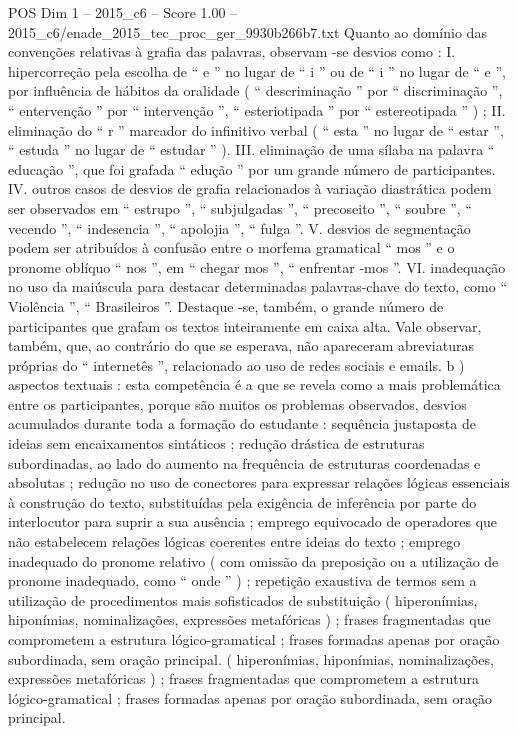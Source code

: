 \begin{textsample}{POS Dim 1 – 2015\_c6 – Score 1.00 – 2015\_c6/enade\_2015\_tec\_proc\_ger\_9930b266b7.txt}
Quanto ao domínio das convenções relativas à grafia das palavras, observam -se desvios como : I. hipercorreção pela escolha de “ e ” no lugar de “ i ” ou de “ i ” no lugar de “ e ”, por influência de hábitos da oralidade ( “ descriminação ” por “ discriminação ”, “ entervenção ” por “ intervenção ”, “ esteriotipada ” por “ estereotipada ” ) ; II. eliminação do “ r ” marcador do infinitivo verbal ( “ esta ” no lugar de “ estar ”, “ estuda ” no lugar de “ estudar ” ).
III. eliminação de uma sílaba na palavra “ educação ”, que foi grafada “ edução ” por um grande número de participantes.
IV. outros casos de desvios de grafia relacionados à variação diastrática podem ser observados em “ estrupo ”, “ subjulgadas ”, “ precoseito ”, “ soubre ”, “ vecendo ”, “ indesencia ”, “ apolojia ”, “ fulga ”.
V. desvios de segmentação podem ser atribuídos à confusão entre o morfema gramatical “ mos ” e o pronome oblíquo “ nos ”, em “ chegar mos ”, “ enfrentar -mos ”.
VI. inadequação no uso da maiúscula para destacar determinadas palavras-chave do texto, como “ Violência ”, “ Brasileiros ”.
Destaque -se, também, o grande número de participantes que grafam os textos inteiramente em caixa alta.
Vale observar, também, que, ao contrário do que se esperava, não apareceram abreviaturas próprias do “ internetês ”, relacionado ao uso de redes sociais e emails. b ) aspectos textuais : esta competência é a que se revela como a mais problemática entre os participantes, porque são muitos os problemas observados, desvios acumulados durante toda a formação do estudante : sequência justaposta de ideias sem encaixamentos sintáticos ; redução drástica de estruturas subordinadas, ao lado do aumento na frequência de estruturas coordenadas e absolutas ; redução no uso de conectores para expressar relações lógicas essenciais à construção do texto, substituídas pela exigência de inferência por parte do interlocutor para suprir a sua ausência ; emprego equivocado de operadores que não estabelecem relações lógicas coerentes entre ideias do texto ; emprego inadequado do pronome relativo ( com omissão da preposição ou a utilização de pronome inadequado, como “ onde ” ) ; repetição exaustiva de termos sem a utilização de procedimentos mais sofisticados de substituição ( hiperonímias, hiponímias, nominalizações, expressões metafóricas ) ; frases fragmentadas que comprometem a estrutura lógico-gramatical ; frases formadas apenas por oração subordinada, sem oração principal. ( hiperonímias, hiponímias, nominalizações, expressões metafóricas ) ; frases fragmentadas que comprometem a estrutura lógico-gramatical ; frases formadas apenas por oração subordinada, sem oração principal.

\end{textsample}
